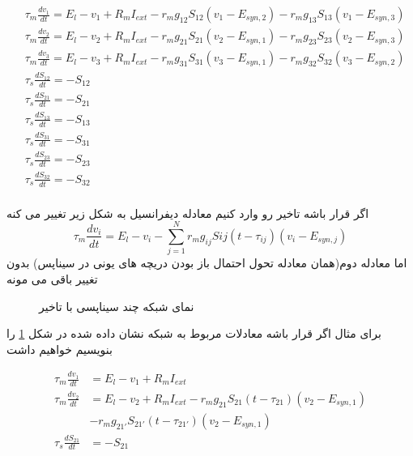     \begin{align}
        & \tau_m \frac{dv_1}{dt}=E_l-v_1 + R_m I_{ext} -r_m  g_{12}S_{12}(v_1-E_{syn,2}) -r_m  g_{13}S_{13}(v_1-E_{syn,3}) \\
        & \tau_m \frac{dv_2}{dt}=E_l-v_2+ R_m I_{ext} -r_m g_{21}S_{21}(v_2-E_{syn,1}) -r_m  g_{23}S_{23}(v_2-E_{syn,3}) \\
        & \tau_m \frac{dv_3}{dt}=E_l-v_3+ R_m I_{ext} -r_m g_{31}S_{31}(v_3-E_{syn,1}) -r_m  g_{32}S_{32}(v_3-E_{syn,2}) \\
        & \tau_s \frac{dS_{12}}{dt}=-S_{12} \\
        & \tau_s \frac{dS_{21}}{dt}=-S_{21} \\
        & \tau_s \frac{dS_{13}}{dt}=-S_{13} \\
        & \tau_s \frac{dS_{31}}{dt}=-S_{31} \\
        & \tau_s \frac{dS_{23}}{dt}=-S_{23} \\
        & \tau_s \frac{dS_{32}}{dt}=-S_{32} \\
    \end{align}

اگر قرار باشه تاخیر رو وارد کنیم معادله دیفرانسیل به شکل زیر تغییر می کنه
\begin{equation}
    \tau_m \frac{dv_i}{dt}=E_l-v_i-\sum_{j=1}^{N} r_m g_{ij}S{ij}(t-\tau_{ij})(v_i-E_{syn,j})
\end{equation}
اما معادله دوم(همان معادله تحول احتمال باز بودن دریچه های یونی در سیناپس) بدون تغییر باقی می مونه

\begin{figure}
    \centering
    \caption{نمای شبکه چند سیناپسی با تاخیر}
    \label{fig:2neurondelay1}
\end{figure}

برای مثال اگر قرار باشه معادلات مربوط به شبکه نشان داده شده در شکل 
\ref{fig:2neurondelay1}
را بنویسیم خواهیم داشت

\begin{equation}
    \begin{align*}
         \tau_m \frac{dv_1}{dt} & =E_l-v_1 + R_m I_{ext} \\
         \tau_m \frac{dv_2}{dt} & =E_l-v_2+ R_m I_{ext} -r_m g_{21}S_{21}(t-\tau_{21})(v_2-E_{syn,1}) \\ 
        & -r_m  g_{21'}S_{21'}(t-\tau_{21'})(v_2-E_{syn,1}) \\
         \tau_s \frac{dS_{21}}{dt} & =-S_{21} \\
    \end{align*}
\end{equation}


